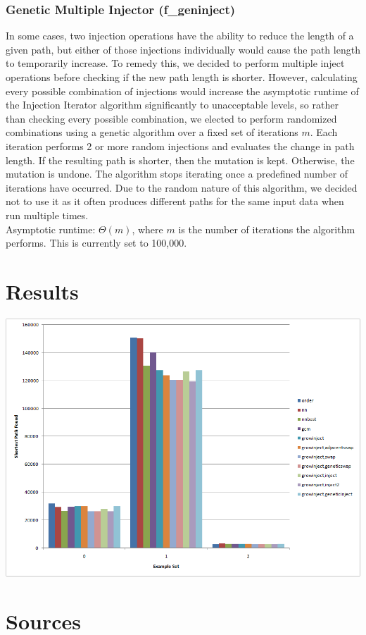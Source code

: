 \documentclass{article}
\begin{document}
\section*{Genetic Multiple Injector (f\_geninject)}

In some cases, two injection operations have the ability to reduce the length
of a given path, but either of those injections individually would cause the
path length to temporarily increase. To remedy this, we decided to perform
multiple inject operations before checking if the new path length is shorter.
However, calculating every possible combination of injections would increase
the asymptotic runtime of the Injection Iterator algorithm significantly to
unacceptable levels, so rather than checking every possible combination, we
elected to perform randomized combinations using a genetic algorithm over a
fixed set of iterations $m$. Each iteration performs 2 or more random
injections and evaluates the change in path length. If the resulting path is
shorter, then the mutation is kept. Otherwise, the mutation is undone. The
algorithm stops iterating once a predefined number of iterations have occurred.
Due to the random nature of this algorithm, we decided not to use it as it
often produces different paths for the same input data when run multiple
times.\\Asymptotic runtime: $\Theta (m)$, where $m$ is the number of iterations
the algorithm performs. This is currently set to 100,000.

\part*{Results}

\includegraphics{output.png}

\part*{Sources}
\end{document}
